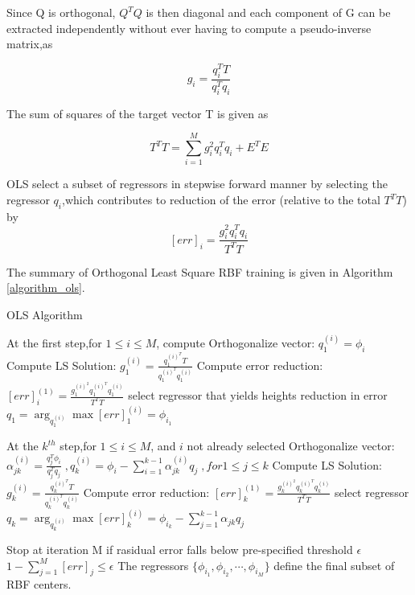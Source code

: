 \documentclass[12pt,a4paper,oneside]{article}
\numberwithin{equation}{section}
\numberwithin{algorithm}{section}
\begin{document}
Since Q is orthogonal, $Q^TQ$ is then diagonal and each component of G can be extracted independently without ever having to compute a pseudo-inverse matrix,as

\begin{equation}\label{ols_pseudo_inverse}
g_i=\frac{q^T_iT}{q^T_iq_i}
\end{equation}

The sum of squares of the target vector T is given as

\begin{equation}
T^TT=\sum\limits_{i=1}^{M}g^2_iq^T_iq_i+E^TE
\end{equation}

OLS select a subset of regressors in stepwise forward manner by selecting the regressor $q_i$,which contributes to reduction of the error (relative to the total $T^TT$) by
\begin{equation}\label{ols_error}
[err]_i=\frac{g^2_iq^T_iq_i}{T^TT}
\end{equation}

The summary of Orthogonal Least Square RBF training \cite{Chen1991} is given in Algorithm \ref{algorithm_ols}.

\begin{algorithm}
\caption{OLS Algorithm}
\label{algorithm_ols}
\begin{algorithmic}[1]
\STATE At the first step,for $1\le i\le M$, compute
\STATE \qquad\qquad Orthogonalize vector: $q^{(i)}_1=\phi_i$
\STATE \qquad\qquad Compute LS Solution:	$g^{(i)}_1=\frac{q^{{(i)}^T}_1T}{q^{{(i)}^T}_1q^{(i)}_1}$
\STATE \qquad\qquad Compute error reduction: $[err]^{(1)}_i=\frac{g^{{(i)}^2}_1q^{{(i)}^T}_1q^{(i)}_1}{T^TT}$
\STATE \quad select regressor that yields heights reduction in error $q_1=\arg_{q^{(i)}_1}\max[err]^{(i)}_1=\phi_{i_1}$


\STATE At the $k^{th}$ step,for $1\le i\le M$, and $i$ not already selected
\STATE \qquad\qquad Orthogonalize vector: $\alpha^{(i)}_{jk}=\frac{q^T_j\phi_i}{q^T_jq_j} \;, q^{(i)}_k=\phi_i-\sum\limits_{i=1}^{k-1}\alpha^{(i)}_{jk}q_j \;, for 1\le j \le k $
\STATE \qquad\qquad Compute LS Solution:	$g^{(i)}_k=\frac{q^{{(i)}^T}_kT}{q^{{(i)}^T}_kq^{(i)}_k}$
\STATE \qquad\qquad Compute error reduction: $[err]^{(1)}_k=\frac{g^{{(i)}^2}_kq^{{(i)}^T}_kq^{(i)}_k}{T^TT}$
\STATE \quad select regressor $q_k=\arg_{q^{(i)}_k}\max[err]^{(i)}_k=\phi_{i_k}-\sum\limits_{j=1}^{k-1}\alpha_{jk}q_j$

\STATE Stop at iteration M if rasidual error falls below pre-specified threshold $\epsilon$
\STATE \qquad\qquad\qquad $1- \sum\limits_{j=1}^{M}[err]_j \le \epsilon $
\STATE The regressors $\lbrace{\phi_{i_1},\phi_{i_2},\cdots,\phi_{i_M}}\rbrace$ define the final subset of RBF centers.
\end{algorithmic}
\end{algorithm}
\end{document}

